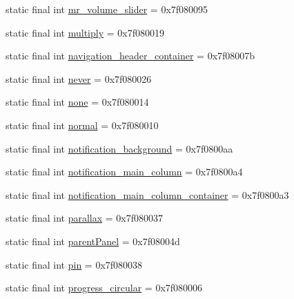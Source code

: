 \begin{CompactItemize}
\item 
static final int \hyperlink{classandroid_1_1support_1_1v7_1_1mediarouter_1_1_r_1_1id_01bd7bd0312780ae4dacc898bfbe0cb6}{mr\_\-volume\_\-slider} = 0x7f080095
\item 
static final int \hyperlink{classandroid_1_1support_1_1v7_1_1mediarouter_1_1_r_1_1id_4c50b285639a0f990e21c58281794702}{multiply} = 0x7f080019
\item 
static final int \hyperlink{classandroid_1_1support_1_1v7_1_1mediarouter_1_1_r_1_1id_15b3d6da2c388a1443adc71f97182211}{navigation\_\-header\_\-container} = 0x7f08007b
\item 
static final int \hyperlink{classandroid_1_1support_1_1v7_1_1mediarouter_1_1_r_1_1id_d28e09ad210bef8d6d7ea57d7292f15c}{never} = 0x7f080026
\item 
static final int \hyperlink{classandroid_1_1support_1_1v7_1_1mediarouter_1_1_r_1_1id_33740e6bf35598602d596823b53f16cf}{none} = 0x7f080014
\item 
static final int \hyperlink{classandroid_1_1support_1_1v7_1_1mediarouter_1_1_r_1_1id_6d53580addf511d547773e6c3be0c3aa}{normal} = 0x7f080010
\item 
static final int \hyperlink{classandroid_1_1support_1_1v7_1_1mediarouter_1_1_r_1_1id_9939932f90d1bac36568988f4b4aadd9}{notification\_\-background} = 0x7f0800aa
\item 
static final int \hyperlink{classandroid_1_1support_1_1v7_1_1mediarouter_1_1_r_1_1id_b6e57de66d108542adead8b0600130fd}{notification\_\-main\_\-column} = 0x7f0800a4
\item 
static final int \hyperlink{classandroid_1_1support_1_1v7_1_1mediarouter_1_1_r_1_1id_ae752609d4ee915f92e2e957abefd1da}{notification\_\-main\_\-column\_\-container} = 0x7f0800a3
\item 
static final int \hyperlink{classandroid_1_1support_1_1v7_1_1mediarouter_1_1_r_1_1id_0df79571bbdaa58f4692a7ddc484c89e}{parallax} = 0x7f080037
\item 
static final int \hyperlink{classandroid_1_1support_1_1v7_1_1mediarouter_1_1_r_1_1id_ecc022f9d265a3038d1cdade4b6049c9}{parentPanel} = 0x7f08004d
\item 
static final int \hyperlink{classandroid_1_1support_1_1v7_1_1mediarouter_1_1_r_1_1id_7bf64bddb8e7a7bde3e60bb11de94169}{pin} = 0x7f080038
\item 
static final int \hyperlink{classandroid_1_1support_1_1v7_1_1mediarouter_1_1_r_1_1id_f7b47b11a8b2c397142712b508375b5e}{progress\_\-circular} = 0x7f080006
\item 

\end{CompactItemize}
